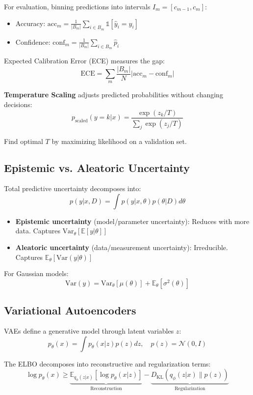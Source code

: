 \documentclass[12pt,a4paper]{article}
\theoremstyle{definition}
\begin{document}
For evaluation, binning predictions into intervals $I_m = [c_{m-1}, c_m]$:
\begin{itemize}
    \item Accuracy: $\text{acc}_m = \frac{1}{|B_m|} \sum_{i \in B_m} \mathbb{1}[\hat{y}_i = y_i]$
    \item Confidence: $\text{conf}_m = \frac{1}{|B_m|} \sum_{i \in B_m} \hat{p}_i$
\end{itemize}

Expected Calibration Error (ECE) measures the gap:
\[
\text{ECE} = \sum_m \frac{|B_m|}{N} |\text{acc}_m - \text{conf}_m|
\]

\textbf{Temperature Scaling} adjusts predicted probabilities without changing decisions:
\[
p_{\text{scaled}}(y=k|x) = \frac{\exp(z_k / T)}{\sum_j \exp(z_j / T)}
\]

Find optimal $T$ by maximizing likelihood on a validation set.

\subsection{Epistemic vs. Aleatoric Uncertainty}

Total predictive uncertainty decomposes into:
\[
p(y | x, D) = \int p(y | x, \theta) p(\theta | D) d\theta
\]

\begin{itemize}
    \item \textbf{Epistemic uncertainty} (model/parameter uncertainty): Reduces with more data. Captures $\mathrm{Var}_\theta[\mathbb{E}[y|\theta]]$
    \item \textbf{Aleatoric uncertainty} (data/measurement uncertainty): Irreducible. Captures $\mathbb{E}_\theta[\mathrm{Var}(y|\theta)]$
\end{itemize}

For Gaussian models:
\[
\mathrm{Var}(y) = \mathrm{Var}_\theta[\mu(\theta)] + \mathbb{E}_\theta[\sigma^2(\theta)]
\]

\subsection{Variational Autoencoders}

VAEs define a generative model through latent variables $z$:
\[
p_\theta(x) = \int p_\theta(x|z) p(z) dz, \quad p(z) = \mathcal{N}(0, I)
\]

The ELBO decomposes into reconstructive and regularization terms:
\[
\log p_\theta(x) \geq \underbrace{\mathbb{E}_{q_\phi(z|x)}[\log p_\theta(x|z)]}_{\text{Reconstruction}} - \underbrace{D_{\mathrm{KL}}(q_\phi(z|x) \| p(z))}_{\text{Regularization}}
\]
\end{document}
